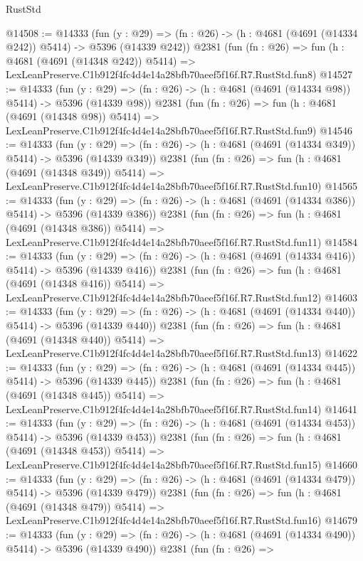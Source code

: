 \begin{lexlean}{RustStd}
\begin{coremodule}
@14508 := @14333
    (fun (y : @29) => (fn : @26) -> (h : @4681 (@4691 (@14334 @242)) @5414) -> @5396 (@14339 @242))
    @2381
    (fun (fn : @26) =>
    fun (h : @4681 (@4691 (@14348 @242)) @5414) =>
    LexLeanPreserve.C1b912f4fc4d4e14a28bfb70aeef5f16f.R7.RustStd.fun8)
@14527 := @14333
    (fun (y : @29) => (fn : @26) -> (h : @4681 (@4691 (@14334 @98)) @5414) -> @5396 (@14339 @98))
    @2381
    (fun (fn : @26) =>
    fun (h : @4681 (@4691 (@14348 @98)) @5414) =>
    LexLeanPreserve.C1b912f4fc4d4e14a28bfb70aeef5f16f.R7.RustStd.fun9)
@14546 := @14333
    (fun (y : @29) => (fn : @26) -> (h : @4681 (@4691 (@14334 @349)) @5414) -> @5396 (@14339 @349))
    @2381
    (fun (fn : @26) =>
    fun (h : @4681 (@4691 (@14348 @349)) @5414) =>
    LexLeanPreserve.C1b912f4fc4d4e14a28bfb70aeef5f16f.R7.RustStd.fun10)
@14565 := @14333
    (fun (y : @29) => (fn : @26) -> (h : @4681 (@4691 (@14334 @386)) @5414) -> @5396 (@14339 @386))
    @2381
    (fun (fn : @26) =>
    fun (h : @4681 (@4691 (@14348 @386)) @5414) =>
    LexLeanPreserve.C1b912f4fc4d4e14a28bfb70aeef5f16f.R7.RustStd.fun11)
@14584 := @14333
    (fun (y : @29) => (fn : @26) -> (h : @4681 (@4691 (@14334 @416)) @5414) -> @5396 (@14339 @416))
    @2381
    (fun (fn : @26) =>
    fun (h : @4681 (@4691 (@14348 @416)) @5414) =>
    LexLeanPreserve.C1b912f4fc4d4e14a28bfb70aeef5f16f.R7.RustStd.fun12)
@14603 := @14333
    (fun (y : @29) => (fn : @26) -> (h : @4681 (@4691 (@14334 @440)) @5414) -> @5396 (@14339 @440))
    @2381
    (fun (fn : @26) =>
    fun (h : @4681 (@4691 (@14348 @440)) @5414) =>
    LexLeanPreserve.C1b912f4fc4d4e14a28bfb70aeef5f16f.R7.RustStd.fun13)
@14622 := @14333
    (fun (y : @29) => (fn : @26) -> (h : @4681 (@4691 (@14334 @445)) @5414) -> @5396 (@14339 @445))
    @2381
    (fun (fn : @26) =>
    fun (h : @4681 (@4691 (@14348 @445)) @5414) =>
    LexLeanPreserve.C1b912f4fc4d4e14a28bfb70aeef5f16f.R7.RustStd.fun14)
@14641 := @14333
    (fun (y : @29) => (fn : @26) -> (h : @4681 (@4691 (@14334 @453)) @5414) -> @5396 (@14339 @453))
    @2381
    (fun (fn : @26) =>
    fun (h : @4681 (@4691 (@14348 @453)) @5414) =>
    LexLeanPreserve.C1b912f4fc4d4e14a28bfb70aeef5f16f.R7.RustStd.fun15)
@14660 := @14333
    (fun (y : @29) => (fn : @26) -> (h : @4681 (@4691 (@14334 @479)) @5414) -> @5396 (@14339 @479))
    @2381
    (fun (fn : @26) =>
    fun (h : @4681 (@4691 (@14348 @479)) @5414) =>
    LexLeanPreserve.C1b912f4fc4d4e14a28bfb70aeef5f16f.R7.RustStd.fun16)
@14679 := @14333
    (fun (y : @29) => (fn : @26) -> (h : @4681 (@4691 (@14334 @490)) @5414) -> @5396 (@14339 @490))
    @2381
    (fun (fn : @26) =>

\end{coremodule}
\end{lexlean}
